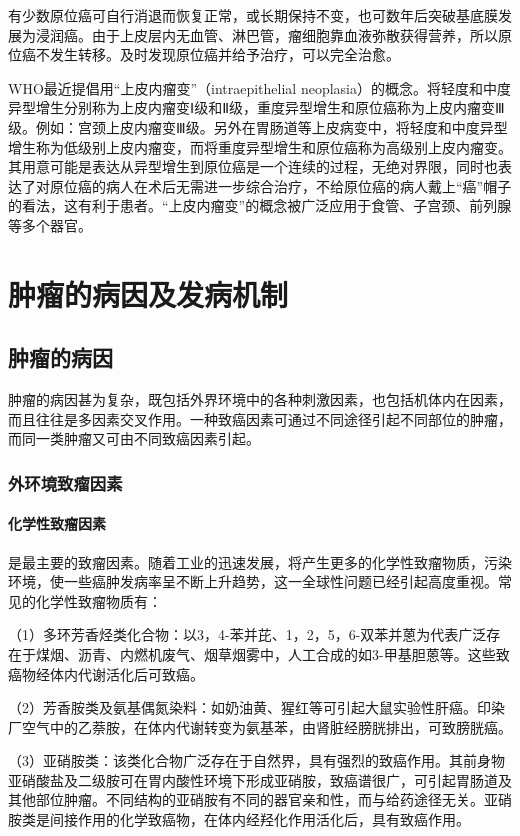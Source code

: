 有少数原位癌可自行消退而恢复正常，或长期保持不变，也可数年后突破基底膜发展为浸润癌。由于上皮层内无血管、淋巴管，瘤细胞靠血液弥散获得营养，所以原位癌不发生转移。及时发现原位癌并给予治疗，可以完全治愈。

WHO最近提倡用“上皮内瘤变”（intraepithelial
neoplasia）的概念。将轻度和中度异型增生分别称为上皮内瘤变Ⅰ级和Ⅱ级，重度异型增生和原位癌称为上皮内瘤变Ⅲ级。例如：宫颈上皮内瘤变Ⅲ级。另外在胃肠道等上皮病变中，将轻度和中度异型增生称为低级别上皮内瘤变，而将重度异型增生和原位癌称为高级别上皮内瘤变。其用意可能是表达从异型增生到原位癌是一个连续的过程，无绝对界限，同时也表达了对原位癌的病人在术后无需进一步综合治疗，不给原位癌的病人戴上“癌”帽子的看法，这有利于患者。“上皮内瘤变”的概念被广泛应用于食管、子宫颈、前列腺等多个器官。

\section{肿瘤的病因及发病机制}

\subsection{肿瘤的病因}

肿瘤的病因甚为复杂，既包括外界环境中的各种刺激因素，也包括机体内在因素，而且往往是多因素交叉作用。一种致癌因素可通过不同途径引起不同部位的肿瘤，而同一类肿瘤又可由不同致癌因素引起。

\subsubsection{外环境致瘤因素}

\paragraph{化学性致瘤因素}
是最主要的致瘤因素。随着工业的迅速发展，将产生更多的化学性致瘤物质，污染环境，使一些癌肿发病率呈不断上升趋势，这一全球性问题已经引起高度重视。常见的化学性致瘤物质有：

（1）多环芳香烃类化合物：以3，4-苯并芘、1，2，5，6-双苯并蒽为代表广泛存在于煤烟、沥青、内燃机废气、烟草烟雾中，人工合成的如3-甲基胆蒽等。这些致癌物经体内代谢活化后可致癌。

（2）芳香胺类及氨基偶氮染料：如奶油黄、猩红等可引起大鼠实验性肝癌。印染厂空气中的乙萘胺，在体内代谢转变为氨基苯，由肾脏经膀胱排出，可致膀胱癌。

（3）亚硝胺类：该类化合物广泛存在于自然界，具有强烈的致癌作用。其前身物亚硝酸盐及二级胺可在胃内酸性环境下形成亚硝胺，致癌谱很广，可引起胃肠道及其他部位肿瘤。不同结构的亚硝胺有不同的器官亲和性，而与给药途径无关。亚硝胺类是间接作用的化学致癌物，在体内经羟化作用活化后，具有致癌作用。

